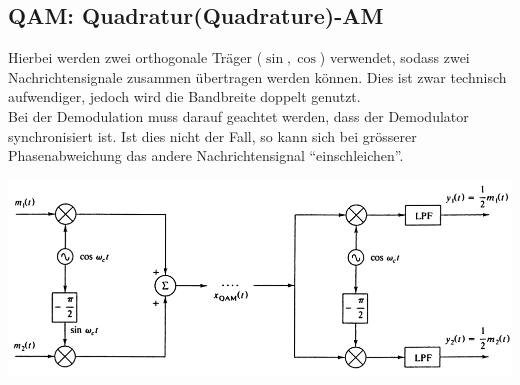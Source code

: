 \subsection{QAM: Quadratur(Quadrature)-AM}
Hierbei werden zwei orthogonale Träger ($\sin, \cos$) verwendet, sodass zwei Nachrichtensignale
zusammen übertragen werden können. Dies ist zwar technisch aufwendiger, jedoch wird die Bandbreite
doppelt genutzt. \\
Bei der Demodulation muss darauf geachtet werden, dass der Demodulator synchronisiert ist. Ist dies
nicht der Fall, so kann sich bei grösserer Phasenabweichung das andere Nachrichtensignal
``einschleichen''.
\begin{center}
    \includegraphics[width=14cm]{bilder/am_qam_modulatorDemodulator.png}
\end{center}
